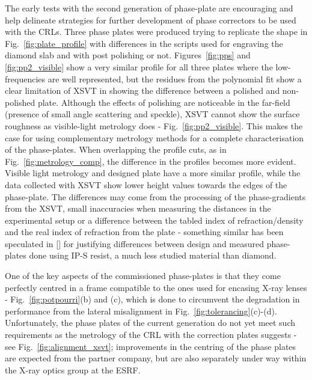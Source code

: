 \begin{refsection}
The early tests with the second generation of phase-plate are encouraging and help delineate strategies for further development of phase correctors to be used with the CRLs. Three phase plates were produced trying to replicate the shape in Fig.~\ref{fig:plate_profile} with differences in the scripts used for engraving the diamond slab and with post polishing or not. Figures~\ref{fig:pps} and \ref{fig:pp2_visible} show a very similar profile for all three plates where the low-frequencies are well represented, but the residues from the polynomial fit show a clear limitation of XSVT in showing the difference between a polished and non-polished plate. Although the effects of polishing are noticeable in the far-field (presence of small angle scattering and speckle), XSVT cannot show the surface roughness as visible-light metrology does - Fig.~\ref{fig:pp2_visible}. This makes the case for using complementary metrology methods for a complete characterisation of the phase-plates. When overlapping the profile cuts, as in Fig.~\ref{fig:metrology_comp}, the difference in the profiles becomes more evident. Visible light metrology and designed plate have a more similar profile, while the data collected with XSVT show lower height values towards the edges of the phase-plate. The differences may come from the processing of the phase-gradients from the XSVT, small inaccuracies when measuring the distances in the experimental setup or a difference between the tabled index of refraction/density and the real index of refraction from the plate - something similar has been speculated in [\cite[\textit{§3.2}]{Seiboth2020}] for justifying differences between design and measured phase-plates done using IP-S resist, a much less studied material than diamond. 

One of the key aspects of the commissioned phase-plates is that they come perfectly centred in a frame compatible to the ones used for encasing X-ray lenses - Fig.~\ref{fig:potpourri}(b) and (c), which is done to circumvent the degradation in performance from the lateral misalignment in Fig.~\ref{fig:tolerancing}(c)-(d). Unfortunately, the phase plates of the current generation do not yet meet such requirements as the metrology of the CRL with the correction plates suggests - see Fig.~\ref{fig:alignment_xsvt}; improvements in the centring of the phase plates are expected from the partner company, but are also separately under way within the X-ray optics group at the ESRF. 


\end{refsection}
